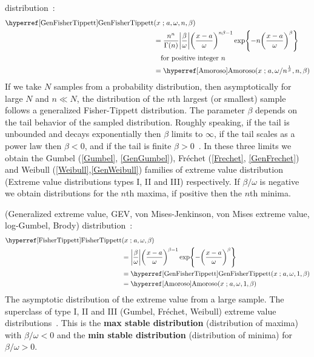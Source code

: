  distribution~\cite{Smirnov1949,Barndorff-Nielsen1963}:
\begin{align}
\label{GenFisherTippett}  
 \opr{GenFisherTippett}&(x\given  a, \omega, n, \beta) 
\notag
\\ \notag
&=
\frac{n^n}{\Gamma(n)} 
\Left|\frac{\beta}{\omega}\Right|
\Left(\frac{x-a}{\omega}\Right)^{n \beta -1}
\exp \Left\{
-  n \Left(\frac{x-a}{\omega}\Right)^{\beta}
\Right\} \checked
\\
& \quad \text{for positive integer } n
\\ \notag
& = \opr{Amoroso}(x\given a,{\omega}/{n^{\frac{1}{\beta} }},n,\beta) \checked
\end{align}
If we take $N$ samples from a probability distribution, then asymptotically for large $N$ and $n\ll N$, the distribution of the $n$th largest (or smallest) sample follows a generalized Fisher-Tippett distribution. The parameter $\beta$ depends on the tail behavior of the sampled distribution. Roughly speaking, if the tail is unbounded and decays exponentially then $\beta$ limits to $\infty$, if the tail scales as a power law then $\beta<0$,  and if the tail is finite $\beta>0$~\cite{Gumbel1958}. In these three limits we obtain the Gumbel (\ref{Gumbel}, \ref{GenGumbel}), Fr\'{e}chet (\ref{Frechet}, \ref{GenFrechet}) and Weibull (\ref{Weibull},\ref{GenWeibull}) families of extreme value distribution (Extreme value distributions types I, II and III) respectively. If $\beta/\omega$ is negative we obtain distributions for the $n$th maxima, if positive then the $n$th minima.


 (Generalized extreme value, GEV, von Mises-Jenkinson, von Mises extreme value, log-Gumbel, Brody) distribution~\cite{Fisher1928, Mises1936, Gumbel1958,Johnson1995,McFadden1978a}:
\begin{align}
\label{FisherTippett}
\opr{FisherTippett}&(x\given  a , \omega, \beta) 
\\ \notag
&=
\Left|\frac{\beta}{\omega}\Right|
\Left(\frac{x-a}{\omega}\Right)^{ \beta -1}
\exp \Left\{
-  \Left(\frac{x-a}{\omega}\Right)^{\beta} 
\Right\} \checked
\\ \notag & = \opr{GenFisherTippett}(x\given a, \omega, 1, \beta) \checked
\\ \notag & = \opr{Amoroso}(x\given a, \omega, 1, \beta) \checked
\end{align}
The asymptotic distribution of the extreme value from a large sample. The superclass of type I, II and III (Gumbel, Fr\'{e}chet, Weibull) extreme value distributions~\cite{Mises1936}.  This is the {\bf max stable distribution} (distribution of maxima) with $\beta/\omega<0$ and the {\bf min stable distribution}  (distribution of minima) for $\beta/\omega>0$.


